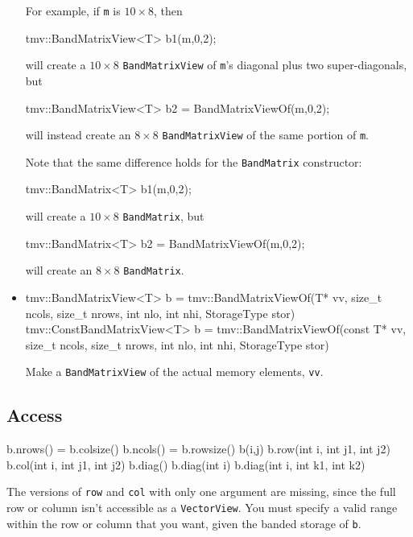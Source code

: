\documentclass[twoside,letterpaper,11pt]{article}
\renewcommand{\tt}[1]{{\lstinline {#1}}}
\begin{document}
\begin{itemize}
For example, if \tt{m} is $10 \times 8$, then 
\begin{tmvcode}
tmv::BandMatrixView<T> b1(m,0,2);
\end{tmvcode}
will create a $10 \times 8$ \tt{BandMatrixView} of \tt{m}'s diagonal plus two super-diagonals, but
\begin{tmvcode}
tmv::BandMatrixView<T> b2 = BandMatrixViewOf(m,0,2);
\end{tmvcode}
will instead create an $8 \times 8$ \tt{BandMatrixView} of the same portion of \tt{m}.

Note that the same difference holds for the \tt{BandMatrix} constructor:
\begin{tmvcode}
tmv::BandMatrix<T> b1(m,0,2);
\end{tmvcode}
will create a $10 \times 8$ \tt{BandMatrix}, but
\begin{tmvcode}
tmv::BandMatrix<T> b2 = BandMatrixViewOf(m,0,2);
\end{tmvcode}
will create an $8 \times 8$ \tt{BandMatrix}.

\item
\begin{tmvcode}
tmv::BandMatrixView<T> b = 
      tmv::BandMatrixViewOf(T* vv, size_t ncols, size_t nrows, 
          int nlo, int nhi, StorageType stor)
tmv::ConstBandMatrixView<T> b = 
      tmv::BandMatrixViewOf(const T* vv, size_t ncols, size_t nrows, 
          int nlo, int nhi, StorageType stor)
\end{tmvcode}
Make a \tt{BandMatrixView} of the actual memory elements, \tt{vv}.

\end{itemize}

\subsection{Access}
\label{BandMatrix_Access}

\begin{tmvcode}
b.nrows() = b.colsize()
b.ncols() = b.rowsize()
b(i,j)
b.row(int i, int j1, int j2)
b.col(int i, int j1, int j2)
b.diag()
b.diag(int i)
b.diag(int i, int k1, int k2)
\end{tmvcode}
The versions of \tt{row} and \tt{col} with only one argument are
missing, since the full row or column isn't accessible as a \tt{VectorView}.
You must specify a valid range within the row or column that you want, 
given the banded storage of \tt{b}.
\end{document}
